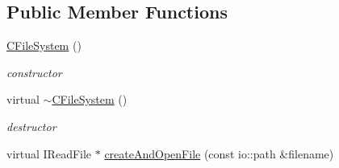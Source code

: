\subsection*{Public Member Functions}
\begin{DoxyCompactItemize}
\item 
\hyperlink{classirr_1_1io_1_1_c_file_system_a79c323f5672bb2b5ba96453f3a872fb0}{C\-File\-System} ()
\begin{DoxyCompactList}\small\item\em constructor \end{DoxyCompactList}\item 
\hypertarget{classirr_1_1io_1_1_c_file_system_a6b5b858d6dfdbd2c87767484361dcea4}{virtual \hyperlink{classirr_1_1io_1_1_c_file_system_a6b5b858d6dfdbd2c87767484361dcea4}{$\sim$\-C\-File\-System} ()}\label{classirr_1_1io_1_1_c_file_system_a6b5b858d6dfdbd2c87767484361dcea4}

\begin{DoxyCompactList}\small\item\em destructor \end{DoxyCompactList}\item 
\hypertarget{classirr_1_1io_1_1_c_file_system_a06761f0a9a7f7cf0df598bdfacc1835b}{virtual I\-Read\-File $\ast$ \hyperlink{classirr_1_1io_1_1_c_file_system_a06761f0a9a7f7cf0df598bdfacc1835b}{create\-And\-Open\-File} (const io\-::path \&filename)}\label{classirr_1_1io_1_1_c_file_system_a06761f0a9a7f7cf0df598bdfacc1835b}


\end{DoxyCompactItemize}
